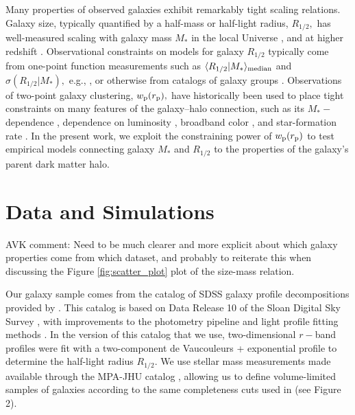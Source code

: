 \documentclass[usenatbib,usegraphicx,letterpaper]{mn2e}
\newcommand{\rhalf}{R_{1/2}}
\newcommand{\mstar}{M_{\ast}}
\newcommand{\rproj}{r_{\rm p}}
\newcommand{\wproj}{w_{\rm p}}
\newcommand{\median}[2]{\langle{#1}\vert{#2}\rangle_{\rm median}}
\begin{document}
Many properties of observed galaxies exhibit remarkably tight scaling relations. Galaxy size, typically quantified by a half-mass or half-light radius, $\rhalf,$ has well-measured scaling with galaxy mass $\mstar$ in the local Universe \citep{shen_etal03,guo_etal09,huang_etal13,lange_etal15,zhang_yang17}, and at higher redshift \citep{trujillo_etal04,vanderwel_etal14,kawamata_etal15,shibuya_etal15,huertas_company_etal13a,huang_etal17}. Observational constraints on models for galaxy $\rhalf$ typically come from one-point function measurements such as $\median{\rhalf}{\mstar}$ and $\sigma(\rhalf\vert\mstar),$ e.g.,  \citet{khochfar_silk06,desmond_etal17,bottrell_etal17b,hou_etal17,somerville_etal17}, or otherwise from catalogs of galaxy groups \citep{weinmann_etal08,huertas_company_etal13b,spindler_wake17}. Observations of two-point galaxy clustering, $\wproj(\rproj),$ have historically been used to place tight constraints on many features of the galaxy--halo connection, such as its $\mstar-$dependence \citep{moster_etal10,leauthaud_etal11,reddick_etal13,skibba_etal15}, dependence on luminosity \citep{tinker_etal05,cacciato_etal13}, broadband color \citep{coil_etal08,zehavi_etal11,guo_etal11,hearin_watson13}, and star-formation rate \citep{wang_etal07,tinker_etal13,watson_etal14}. In the present work, we exploit the constraining power of $\wproj(\rproj)$ to test empirical models connecting galaxy $\mstar$ and $\rhalf$ to the properties of the galaxy's parent dark matter halo.


\section{Data and Simulations}
\label{sec:data}

{\color{blue} AVK comment: Need to be much clearer and more explicit about which galaxy properties come from which dataset, and probably to reiterate this when discussing the Figure \ref{fig:scatter_plot} plot of the size-mass relation.}

Our galaxy sample comes from the catalog of SDSS galaxy profile decompositions provided by \citet{meert_etal15}. This catalog is based on Data Release 10 of the Sloan Digital Sky Survey \citep[SDSS,][]{ahn_etal14}, with improvements to the photometry pipeline and light profile fitting methods \citep{vikram_etal10,bernardi_etal13,bernardi_etal14,meert_etal13}. In the version of this catalog that we use, two-dimensional $r-$band profiles were fit with a two-component de Vaucouleurs + exponential profile to determine the half-light radius $\rhalf.$ We use stellar mass measurements made available through the MPA-JHU catalog \citep{kauffmann_etal03,brinchmann_etal04}, allowing us to define volume-limited samples of galaxies according to the same completeness cuts used in \citet{behroozi_etal15} (see Figure 2).
\end{document}
